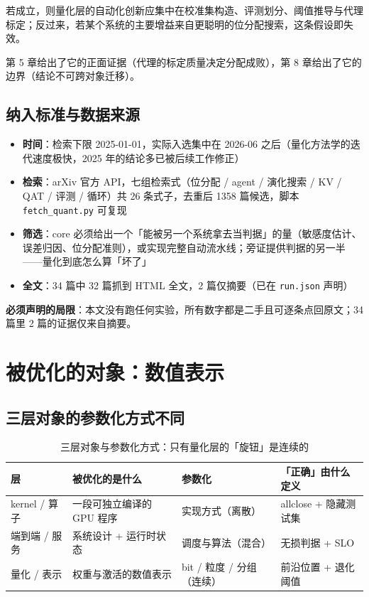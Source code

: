若成立，则量化层的自动化创新应集中在校准集构造、评测划分、阈值推导与代理标定；反过来，若某个系统的主要增益来自更聪明的位分配搜索，这条假设即失效。


第 5 章给出了它的正面证据（代理的标定质量决定分配成败），第 8 章给出了它的边界（结论不可跨对象迁移）。


\subsection{纳入标准与数据来源}

\begin{itemize}
  \item \textbf{时间}：检索下限 2025-01-01，实际入选集中在 2026-06 之后（量化方法学的迭代速度极快，2025 年的结论多已被后续工作修正）
  \item \textbf{检索}：arXiv 官方 API，七组检索式（位分配 / agent / 演化搜索 / KV / QAT / 评测 / 循环）共 26 条式子，去重后 1358 篇候选，脚本 \texttt{fetch\_quant.py} 可复现
  \item \textbf{筛选}：core 必须给出一个「能被另一个系统拿去当判据」的量（敏感度估计、误差归因、位分配准则），或实现完整自动流水线；旁证提供判据的另一半——量化到底怎么算「坏了」
  \item \textbf{全文}：34 篇中 32 篇抓到 HTML 全文，2 篇仅摘要（已在 \texttt{run.json} 声明）
\end{itemize}

 \textbf{必须声明的局限}：本文没有跑任何实验，所有数字都是二手且可逐条点回原文；34 篇里 2 篇的证据仅来自摘要。


\section{被优化的对象：数值表示}

\subsection{三层对象的参数化方式不同}

\begin{table}[t]
\centering
\footnotesize
\setlength{\tabcolsep}{4pt}
\caption{三层对象与参数化方式：只有量化层的「旋钮」是连续的}
\label{tab:1}
\begin{tabular}{llll}
\toprule
层 & 被优化的是什么 & 参数化 & 「正确」由什么定义 \\
\midrule
kernel / 算子 & 一段可独立编译的 GPU 程序 & 实现方式（离散） & allclose + 隐藏测试集 \\
端到端 / 服务 & 系统设计 + 运行时状态 & 调度与算法（混合） & 无损判据 + SLO \\
量化 / 表示 & 权重与激活的数值表示 & bit / 粒度 / 分组（连续） & 前沿位置 + 退化阈值 \\
\bottomrule
\end{tabular}
\end{table}

